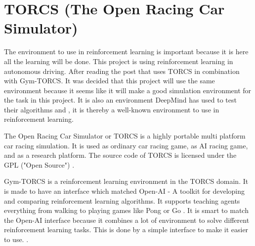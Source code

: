 \section{TORCS (The Open Racing Car Simulator)}
\label{sec:TORCS}
The environment to use in reinforcement learning is important because it is here all the learning will be done. This project is using reinforcement learning in autonomous driving. After reading the post \cite{DDPG_Torcs} that uses TORCS in combination with Gym-TORCS. It was decided that this project will use the same environment because it seems like it will make a good simulation environment for the task in this project. It is also an environment DeepMind has used to test their algorithms \cite{DBLP:journals/corr/LillicrapHPHETS15} and \cite{DBLP:journals/corr/MnihBMGLHSK16}, it is thereby a well-known environment to use in reinforcement learning. 

The Open Racing Car Simulator or TORCS is a highly portable multi platform car racing simulation. It is used as ordinary car racing game, as AI racing game, and as a research platform. The source code of TORCS is licensed under the GPL ("Open Source") \cite{TORCS_website}. 

Gym-TORCS is a reinforcement learning environment in the TORCS domain. It is made to have an interface which matched Open-AI - A toolkit for developing and comparing reinforcement learning algorithms. It supports teaching agents everything from walking to playing games like Pong or Go \cite{OPENAI_website}. It is smart to match the Open-AI interface because it combines a lot of environment to solve different reinforcement learning tasks. This is done by a simple interface to make it easier to use. \cite{Gym_TORCS_website}. 

\newpage

